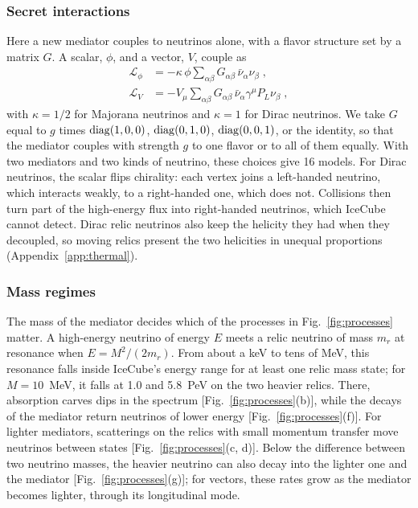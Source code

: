 \documentclass[linenumbers, aps, prd, twocolumn, superscriptaddress, floatfix, longbibliography, nofootinbib, bibnotes]{revtex4-2}
\begin{document}
\subsubsection{Secret interactions}
Here a new mediator couples to neutrinos alone, with a flavor structure set by a matrix $G$.
A scalar, $\phi$, and a vector, $V$, couple as
\begin{equation}
 \label{equ:lag_si}
 \begin{split}
 \mathcal{L}_\phi &= -\kappa\, \phi \sum_{\alpha\beta} G_{\alpha\beta}\, \bar\nu_\alpha \nu_\beta \;, \\
 \mathcal{L}_V &= -V_\mu \sum_{\alpha\beta} G_{\alpha\beta}\, \bar\nu_\alpha \gamma^\mu P_L \nu_\beta \;,
 \end{split}
\end{equation}
with $\kappa = 1/2$ for Majorana neutrinos and $\kappa = 1$ for Dirac neutrinos.
We take $G$ equal to $g$ times ${\rm diag}(1, 0, 0)$, ${\rm diag}(0, 1, 0)$, ${\rm diag}(0, 0, 1)$, or the identity, so that the mediator couples with strength $g$ to one flavor or to all of them equally.
With two mediators and two kinds of neutrino, these choices give 16 models.
For Dirac neutrinos, the scalar flips chirality: each vertex joins a left-handed neutrino, which interacts weakly, to a right-handed one, which does not.
Collisions then turn part of the high-energy flux into right-handed neutrinos, which IceCube cannot detect.
Dirac relic neutrinos also keep the helicity they had when they decoupled, so moving relics present the two helicities in unequal proportions (Appendix~\ref{app:thermal}).

\subsubsection{Mass regimes}
The mass of the mediator decides which of the processes in Fig.~\ref{fig:processes} matter.
A high-energy neutrino of energy $E$ meets a relic neutrino of mass $m_r$ at resonance when $E = M^2/(2 m_r)$.
From about a keV to tens of MeV, this resonance falls inside IceCube's energy range for at least one relic mass state; for $M = 10$~MeV, it falls at 1.0 and 5.8~PeV on the two heavier relics.
There, absorption carves dips in the spectrum [Fig.~\ref{fig:processes}(b)], while the decays of the mediator return neutrinos of lower energy [Fig.~\ref{fig:processes}(f)].
For lighter mediators, scatterings on the relics with small momentum transfer move neutrinos between states [Fig.~\ref{fig:processes}(c, d)].
Below the difference between two neutrino masses, the heavier neutrino can also decay into the lighter one and the mediator [Fig.~\ref{fig:processes}(g)]; for vectors, these rates grow as the mediator becomes lighter, through its longitudinal mode.
\end{document}
